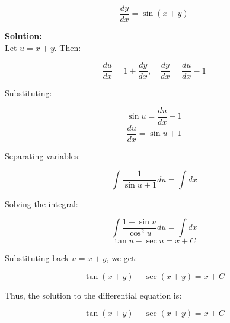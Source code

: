 \documentclass[12pt]{article}
\begin{document}
\[
\frac{dy}{dx} = \sin(x + y)
\]

\textbf{Solution:} \\
Let \(u = x + y\). Then:

\[
\frac{du}{dx} = 1 + \frac{dy}{dx}, \quad \frac{dy}{dx} = \frac{du}{dx} - 1
\]

Substituting:

\[
\sin u = \frac{du}{dx} - 1
\]
\[
\frac{du}{dx} = \sin u + 1
\]

Separating variables:

\[
\int \frac{1}{\sin u + 1}du = \int dx
\]

Solving the integral:

\[
\int \frac{1 - \sin u}{\cos^2 u}du = \int dx
\]
\[
\tan u - \sec u = x + C
\]

Substituting back \(u = x + y\), we get:

\[
\tan(x + y) - \sec(x + y) = x + C
\]

Thus, the solution to the differential equation is:

\[
\tan(x + y) - \sec(x + y) = x + C
\]
\end{document}
